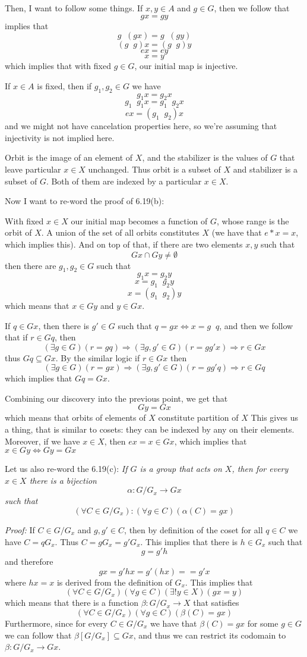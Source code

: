 \documentclass[11pt,oneside,titlepage]{book}
\DeclareMathOperator \inv {^{-1}}
\DeclareMathOperator \lra {\Leftrightarrow}
\DeclareMathOperator \ra {\Rightarrow}
\begin{document}
Then, I want to follow some things. If $x, y \in A$ and $g \in G$,
then we follow that
$$gx = gy$$
implies that
$$g\inv (g x) = g\inv (gy)$$
$$(g\inv g) x = (g\inv g)y$$
$$e x = e y$$
$$x = y$$
which implies that with fixed $g \in G$, our initial map is injective.

If $x \in A$ is fixed, then if $g_1, g_2 \in G$ we have
$$g_1 x = g_2 x$$
$$g_1 \inv g_1 x = g_1 \inv g_2 x$$
$$e x = (g_1 \inv g_2) x$$
and we might not have cancelation properties here, so we're assuming
that injectivity is not implied here.

Orbit is the image of an element of $X$, and the stabilizer is the
values of $G$ that leave particular $x \in X$ unchanged.  Thus orbit
is a subset of $X$ and stabilizer is a subset of $G$.  Both of them
are indexed by a particular $x \in X$.

Now I want to re-word the proof of 6.19(b):

With fixed $x \in X$ our initial map becomes a function of $G$, whose range is the orbit of $X$. A union of the set of all orbits constitutes $X$ (we have that $e * x = x$, which implies this).  And on top of that, if there are two elements $x, y$ such that
$$Gx \cap Gy \neq \emptyset$$
then there are $g_1, g_2 \in G$ such that
$$g_1 x = g_2 y$$
$$ x = g_1 \inv g_2 y$$
$$ x = (g_1 \inv g_2) y$$
which means that $x \in Gy$ and $y \in Gx$.

If $q \in Gx$, then there is $g' \in G$ such that
$q = gx \lra x = g\inv q$, and then we follow that if $r \in Gq$, then
$$(\exists g \in G) (r = gq) \ra (\exists g, g' \in G) (r = gg'x) \ra r \in Gx$$
thus $Gq \subseteq Gx$. By the similar logic if $r \in Gx$ then
$$(\exists g \in G) (r = gx) \ra (\exists g, g' \in G) (r = gg'q) \ra r \in Gq$$
which implies that $Gq = Gx$.

Combining our discovery into the previous point, we get that
$$Gy = Gx$$
which means that orbits of elements of $X$ constitute partition of $X$
This gives us a thing, that is similar to cosets: they can be indexed
by any on their elements. Moreover, if we have $x \in X$, then
$ex = x  \in Gx$, which implies that $x \in Gy \iff Gy = Gx$

Let us also re-word the 6.19(c): \textit{If $G$ is a group that acts
on $X$, then for every $x \in X$ there is a bijection
$$\alpha: G/G_x \to Gx$$
such that
$$(\forall C \in G/G_x): (\forall g \in C)(\alpha(C) = gx)$$}

\textit{Proof: } If $C \in G/G_x$ and $g, g' \in C$, then by definition of
the coset for all $q \in C$ we have $C = qG_x$. Thus
$C = gG_x = g'G_x$. This implies that there is $h \in G_x$
such that
$$g = g' h$$
and therefore
$$gx = g' h x = g' (h x) =  = g'x$$
where $hx = x$ is derived from the definition of $G_x$.
This implies that
$$(\forall C \in G/G_x)(\forall g \in C)(\exists !  y \in X)(gx = y)$$
which means that there is a function $\beta: G/G_x \to X$ that satisfies
$$(\forall C \in G/G_x)( \forall g \in C)(\beta(C) = gx)$$
Furthermore, since for every $C \in G/G_x$ we have that $\beta(C) = gx$
for some $g \in G$ we can follow that $\beta[G/G_x] \subseteq Gx$,
and thus we can restrict its codomain to $\beta: G/G_x \to Gx$.
\end{document}
